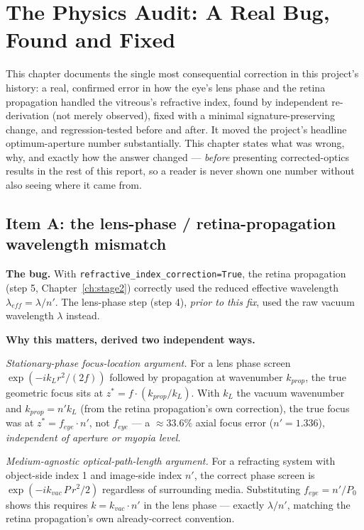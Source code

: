 \chapter{The Physics Audit: A Real Bug, Found and Fixed}
\label{ch:physics_audit}

This chapter documents the single most consequential correction in this project's
history: a real, confirmed error in how the eye's lens phase and the retina
propagation handled the vitreous's refractive index, found by independent re-derivation
(not merely observed), fixed with a minimal signature-preserving change, and
regression-tested before and after. It moved the project's headline optimum-aperture
number substantially. This chapter states what was wrong, why, and exactly how the
answer changed --- \emph{before} presenting corrected-optics results in the rest of this
report, so a reader is never shown one number without also seeing where it came from.

\section{Item A: the lens-phase / retina-propagation wavelength mismatch}

\textbf{The bug.} With \texttt{refractive\_index\_correction=True}, the retina
propagation (step 5, Chapter~\ref{ch:stage2}) correctly used the reduced effective
wavelength $\lambda_{eff}=\lambda/n'$. The lens-phase step (step 4), \emph{prior to
this fix}, used the raw vacuum wavelength $\lambda$ instead.

\textbf{Why this matters, derived two independent ways.}

\emph{Stationary-phase focus-location argument.} For a lens phase screen
$\exp(-ik_L r^2/(2f))$ followed by propagation at wavenumber $k_{prop}$, the true
geometric focus sits at $z^\ast = f\cdot(k_{prop}/k_L)$. With $k_L$ the vacuum
wavenumber and $k_{prop}=n' k_L$ (from the retina propagation's own correction), the
true focus was at $z^\ast=f_{eye}\cdot n'$, not $f_{eye}$ --- a $\approx 33.6\%$ axial
focus error ($n'=1.336$), \emph{independent of aperture or myopia level}.

\emph{Medium-agnostic optical-path-length argument.} For a refracting system with
object-side index 1 and image-side index $n'$, the correct phase screen is
$\exp(-ik_{vac}\,P\,r^2/2)$ regardless of surrounding media. Substituting
$f_{eye}=n'/P_0$ shows this requires $k=k_{vac}\cdot n'$ in the lens phase ---
exactly $\lambda/n'$, matching the retina propagation's own already-correct
convention.

